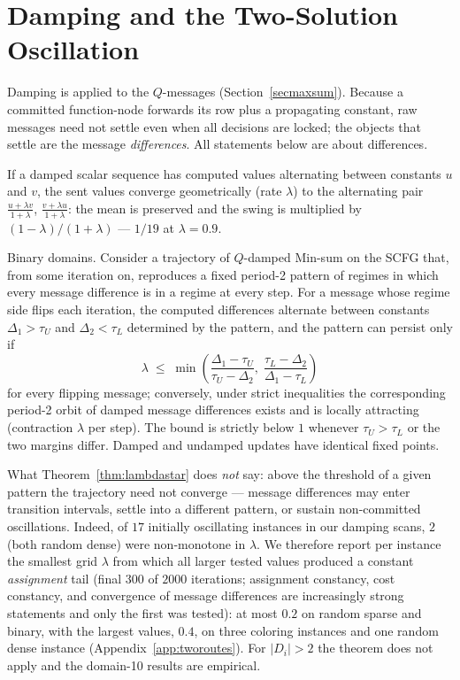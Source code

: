 \section{Damping and the Two-Solution Oscillation}\label{sec:whydamping}

Damping is applied to the $Q$-messages
(Section~\ref{secmaxsum}).  Because a committed function-node forwards
its row plus a propagating constant, raw messages need not settle even
when all decisions are locked; the objects that settle are the message
\emph{differences}.  All statements below are about differences.

\begin{lemma}\label{lem:ema}
If a damped scalar sequence has computed values alternating between
constants $u$ and $v$, the sent values converge geometrically (rate
$\lambda$) to the alternating pair $\frac{u+\lambda v}{1+\lambda}$,
$\frac{v+\lambda u}{1+\lambda}$: the mean is preserved and the swing is
multiplied by $(1-\lambda)/(1+\lambda)$ --- $1/19$ at $\lambda = 0.9$.
\end{lemma}

\begin{theorem}\label{thm:lambdastar}
Binary domains.  Consider a trajectory of $Q$-damped Min-sum on the SCFG
that, from some iteration on, reproduces a fixed period-2 pattern of
regimes in which every message difference is in a regime at every step.
For a message whose regime side flips each iteration, the computed
differences alternate between constants $\Delta_1 > \tau_U$ and
$\Delta_2 < \tau_L$ determined by the pattern, and the pattern can
persist only if
\[
  \lambda \;\le\;
  \min\!\left(
    \frac{\Delta_1 - \tau_U}{\tau_U - \Delta_2},\;
    \frac{\tau_L - \Delta_2}{\Delta_1 - \tau_L}
  \right)
\]
for every flipping message; conversely, under strict inequalities the
corresponding period-2 orbit of damped message differences exists and is
locally attracting (contraction $\lambda$ per step).  The bound is
strictly below $1$ whenever $\tau_U > \tau_L$ or the two margins differ.
Damped and undamped updates have identical fixed points.
\end{theorem}

What Theorem~\ref{thm:lambdastar} does \emph{not} say: above the
threshold of a given pattern the trajectory need not converge ---
message differences may enter transition intervals, settle into a
different pattern, or sustain non-committed oscillations.  Indeed, of
$17$ initially oscillating instances in our damping scans, $2$ (both
random dense) were non-monotone in $\lambda$.  We therefore report per
instance the smallest grid $\lambda$ from which all larger tested values
produced a constant \emph{assignment} tail (final $300$ of $2000$
iterations; assignment constancy, cost constancy, and convergence of
message differences are increasingly strong statements and only the
first was tested): at most $0.2$ on random sparse and binary, with the
largest values, $0.4$, on three coloring instances and one random dense
instance (Appendix~\ref{app:tworoutes}).  For $|D_i| > 2$ the theorem
does not apply and the domain-10 results are empirical.

